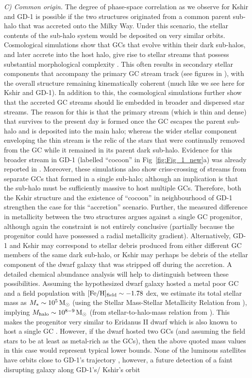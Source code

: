 \documentclass[apj]{emulateapj}
\newcommand{\msun}{${\rm M_{\sun}}$}
\def\msun{{\rm\,M_\odot}}
\begin{document}
{\it C) Common origin.} The degree of phase-space correlation as we observe for Kshir and GD-1 is possible if the two structures originated from a common parent sub-halo that was accreted onto the Milky Way. Under this scenario, the stellar contents of the sub-halo system would be deposited on very similar orbits. Cosmological simulations show that GCs that evolve within their dark sub-halos, and later accrete into the host halo, give rise to stellar streams that possess substantial morphological complexity \citep{Carlberg2018-StreamSimulation}. This often results in secondary stellar components that accompany the primary GC stream track (see figures in \citealt{Carlberg2018-DensityIn_Stream}), with the overall structure remaining kinematically coherent (much like we see here for Kshir and GD-1). In addition to this, the cosmological simulations further show that the accreted GC streams should lie embedded in broader and dispersed star streams. The reason for this is that the primary stream (which is thin and dense) that survives to the present day is formed once the GC escapes the parent sub-halo and is deposited into the main halo; whereas the wider stellar component enveloping the thin stream is the relic of the stars that were continually removed from the GC while it remained in its parent dark sub-halo. Evidence for this broader stream in GD-1 (labelled ``cocoon'' in Fig~\ref{fig:Fig_1_new}a) was already reported in \citet{MalhanCocoonDetection2019}. Moreover, these simulations also show criss-crossing of streams from separate GCs that formed in a single sub-halo; although an implication is that the sub-halo must be sufficiently massive to host multiple GCs. Therefore, both the Kshir structure and the existence of ``cocoon'' in neighbourhood of GD-1 strengthen the case for this ``accretion'' scenario. Further, the measured difference in metallicity between the two structures argues against a single GC progenitor, although again the constraint is not entirely conclusive (partially because the progenitor could have possessed a radial metallicity gradient). Alternatively, GD-1 and Kshir may correspond to stellar debris produced from either different GC members of the same dark sub-halo, or Kshir may perhaps be debris of the stellar component of the dwarf galaxy that was stripped off during the accretion. A detailed chemical abundance analysis will help to distinguish between these possibilities. Assuming the hypothesized dwarf galaxy hosted a metal poor GC and a field population with ${\rm [Fe/H]_{\rm field}\sim-1.78}$ dex, we estimate its total stellar mass as $M_{*}\sim 10^5 \msun$ (using the Stellar Mass-Stellar Metallicity Relation from \citealt{Kirby2013}), implying $M_{\rm halo}\sim 10^{8-9}\msun$ (from stellar-to-halo-mass relation from \citealt{Read2017}). This makes the progenitor very similar to Eridanus II dwarf \citep{Bechtol2015} which is also known to host a single GC \citep{Crnojevi2016}. However, if the dwarf hosted two GCs (and assuming the field stars to be at least as metal-rich as the GCs), then the above quoted mass values in this case would represent typical lower bounds. None of the luminous satellites have orbits close to GD-1's trajectory \citep{Bonaca_spur_2018}, however, a future detection of a faint disrupting galaxy along GD-1's/ Kshir's orbit 
\end{document}
